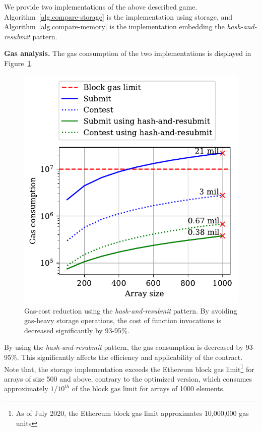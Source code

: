 We provide two implementations of the above described game.
Algorithm~\ref{alg.compare-storage} is the implementation using storage, and
Algorithm~\ref{alg.compare-memory} is the implementation embedding the
\emph{hash-and-resubmit} pattern.



\noindent \textbf{Gas analysis.} The gas consumption of the two implementations
is displayed in Figure~\ref{fig:har-example}.

\begin{figure}[h!]
\begin{center}
\includegraphics[width=1 \columnwidth]{figures/har-example.pdf}
\end{center}
\caption{Gas-cost reduction using the \emph{hash-and-resubmit} pattern. By
avoiding gas-heavy storage operations, the cost of function invocations is
decreased significantly by 93-95\%.}
\label{fig:har-example}
\end{figure}

By using the \emph{hash-and-resubmit} pattern, the gas consumption is decreased
by 93-95\%. This significantly affects the efficiency and applicability of the
contract. Note that, the storage implementation exceeds the Ethereum block gas
limit\footnote{As of July 2020, the Ethereum block gas limit approximates
10,000,000 gas units} for arrays of size 500 and above, contrary to the
optimized version, which consumes approximately $1/10^{th}$ of the block gas
limit for arrays of 1000 elements.

